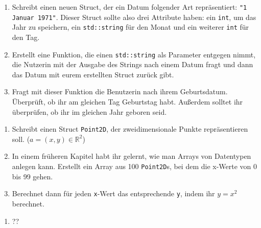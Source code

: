 \begin{praxis}
    \begin{enumerate}
        \item Schreibt einen neuen Struct, der ein Datum folgender Art repräsentiert: \texttt{"1 Januar 1971"}.
              Dieser Struct sollte also drei Attribute haben:
              ein \texttt{int}, um das Jahr zu speichern,
              ein \texttt{std::string} für den Monat
              und ein weiterer \texttt{int} für den Tag.

        \item Erstellt eine Funktion, die einen \texttt{std::string} als Parameter entgegen nimmt, die Nutzerin mit der Ausgabe des Strings nach einem Datum fragt und dann das Datum mit eurem erstellten Struct zurück gibt.

        \item Fragt mit dieser Funktion die Benutzerin nach ihrem Geburtsdatum. Überprüft, ob ihr am gleichen Tag Geburtstag habt.
              Außerdem solltet ihr überprüfen, ob ihr im gleichen Jahr geboren seid.
    \end{enumerate}
\end{praxis}
\begin{praxis}[(Quadratsfunktion)]

    \begin{enumerate}
        \item Schreibt einen Struct \texttt{Point2D}, der zweidimensionale Punkte
              repräsentieren soll. ($a = (x, y) \in \mathbb{R}^2$)
        \item In einem früheren Kapitel habt ihr gelernt, wie man Arrays von
              Datentypen anlegen kann. Erstellt ein Array aus 100 \texttt{Point2D}s, bei dem die
              x-Werte von 0 bis 99 gehen.
        \item Berechnet dann für jeden \texttt{x}-Wert das entsprechende \texttt{y},
              indem ihr $y = x^2$ berechnet.
    \end{enumerate}
\end{praxis}

\begin{spiel}
    \begin{enumerate}
        \item ??
    \end{enumerate}
\end{spiel}
